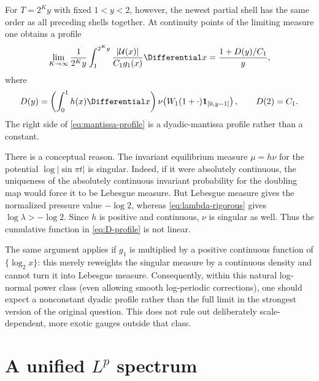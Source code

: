 \documentclass[11pt,oneside]{article}
\theoremstyle{definition}
\theoremstyle{remark}
\newcommand{\Uhat}{\mathcal U}
\begin{document}
For $T=2^Ky$ with fixed $1<y<2$, however, the newest partial shell has the same order as
all preceding shells together.  At continuity points of the limiting measure one obtains
a profile
\begin{equation}\label{eq:mantissa-profile}
 \lim_{K\to\infty}
 \frac1{2^Ky}\int_{1}^{2^Ky}
 \frac{|\Uhat(x)|}{C_1g_1(x)}\Differential x
 =\frac{1+D(y)/C_1}{y},
\end{equation}
where
\begin{equation}\label{eq:D-profile}
 D(y)=\left(\int_0^1h(x)\Differential x\right)
 \nu\!\left(W_1(1+\cdot)\mathbf1_{[0,y-1]}\right),
 \qquad D(2)=C_1.
\end{equation}
The right side of \eqref{eq:mantissa-profile} is a dyadic-mantissa profile rather than a
constant.

There is a conceptual reason.  The invariant equilibrium measure $\mu=h\nu$ for the
potential $\log|\sin\pi t|$ is singular.  Indeed, if it were absolutely continuous, the
uniqueness of the absolutely continuous invariant probability for the doubling map would
force it to be Lebesgue measure.  But Lebesgue measure gives the normalized pressure
value $-\log2$, whereas \eqref{eq:lambda-rigorous} gives
$\log\lambda>-\log2$.  Since $h$ is positive and continuous, $\nu$ is singular as well.
Thus the cumulative function in \eqref{eq:D-profile} is not linear.

The same argument applies if $g_1$ is multiplied by a positive continuous function of
$\{\log_2x\}$: this merely reweights the singular measure by a continuous density and
cannot turn it into Lebesgue measure.  Consequently, within this natural log-normal
power class (even allowing smooth log-periodic corrections), one should expect a
nonconstant dyadic profile rather than the full limit in the strongest version of the
original question.  This does not rule out deliberately scale-dependent, more exotic
gauges outside that class.

\section{A unified \texorpdfstring{$L^p$}{Lp} spectrum}\label{sec:Lp}
\end{document}

